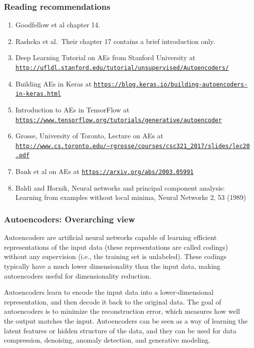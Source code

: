 \documentclass{beamer}
\begin{document}
\begin{frame}
\frametitle{Reading recommendations}

\begin{block}{}
\begin{enumerate}
\item Goodfellow et al chapter 14.

\item Rashcka et al.~Their chapter 17 contains a brief introduction only.

\item Deep Learning Tutorial on AEs from Stanford University at \href{{http://ufldl.stanford.edu/tutorial/unsupervised/Autoencoders/}}{\nolinkurl{http://ufldl.stanford.edu/tutorial/unsupervised/Autoencoders/}}

\item Building AEs in Keras at \href{{https://blog.keras.io/building-autoencoders-in-keras.html}}{\nolinkurl{https://blog.keras.io/building-autoencoders-in-keras.html}}

\item Introduction to AEs in TensorFlow at \href{{https://www.tensorflow.org/tutorials/generative/autoencoder}}{\nolinkurl{https://www.tensorflow.org/tutorials/generative/autoencoder}}

\item Grosse, University of Toronto, Lecture on AEs at \href{{http://www.cs.toronto.edu/~rgrosse/courses/csc321_2017/slides/lec20.pdf}}{\nolinkurl{http://www.cs.toronto.edu/~rgrosse/courses/csc321_2017/slides/lec20.pdf}}

\item Bank et al on AEs at \href{{https://arxiv.org/abs/2003.05991}}{\nolinkurl{https://arxiv.org/abs/2003.05991}}  

\item Baldi and Hornik, Neural networks and principal component analysis: Learning from examples without local minima, Neural Networks 2, 53 (1989)
\end{enumerate}

\noindent
\end{block}
\end{frame}

\begin{frame}
\frametitle{Autoencoders: Overarching view}

Autoencoders are artificial neural networks capable of learning
efficient representations of the input data (these representations are called codings)  without
any supervision (i.e., the training set is unlabeled). These codings
typically have a much lower dimensionality than the input data, making
autoencoders useful for dimensionality reduction. 

Autoencoders learn to encode the
input data into a lower-dimensional representation, and then decode it
back to the original data. The goal of autoencoders is to minimize the
reconstruction error, which measures how well the output matches the
input. Autoencoders can be seen as a way of learning the latent
features or hidden structure of the data, and they can be used for
data compression, denoising, anomaly detection, and generative
modeling.
\end{frame}
\end{document}
